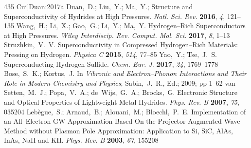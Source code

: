 \documentclass[12pt,letterpaper,oneside]{article}
\begin{document}
\begin{mcitethebibliography}{435}
  Cui]{Duan:2017a}
Duan,~D.; Liu,~Y.; Ma,~Y.;   Structure and
  Superconductivity of Hydrides at High Pressures. \emph{Natl. Sci. Rev.}
  \textbf{2016}, \emph{4}, 121--135\relax
\mciteBstWouldAddEndPuncttrue
\mciteSetBstMidEndSepPunct{\mcitedefaultmidpunct}
{\mcitedefaultendpunct}{\mcitedefaultseppunct}\relax
\EndOfBibitem
{}
Wang,~H.; Li,~X.; Gao,~G.; Li,~Y.; Ma,~Y. Hydrogen--Rich Superconductors at
  High Pressures. \emph{Wiley Interdiscip. Rev. Comput. Mol. Sci.}
  \textbf{2017}, \emph{8}, 1--13\relax
\mciteBstWouldAddEndPuncttrue
\mciteSetBstMidEndSepPunct{\mcitedefaultmidpunct}
{\mcitedefaultendpunct}{\mcitedefaultseppunct}\relax
\EndOfBibitem
{}
Struzhkin,~V.~V. Superconductivity in Compressed Hydrogen--Rich Materials:
  Pressing on Hydrogen. \emph{Physica C} \textbf{2015}, \emph{514},
  77--85\relax
\mciteBstWouldAddEndPuncttrue
\mciteSetBstMidEndSepPunct{\mcitedefaultmidpunct}
{\mcitedefaultendpunct}{\mcitedefaultseppunct}\relax
\EndOfBibitem
{}
Yao,~Y.; Tse,~J.~S. Superconducting Hydrogen Sulfide. \emph{Chem. Eur. J.}
  \textbf{2017}, \emph{24}, 1769--1778\relax
\mciteBstWouldAddEndPuncttrue
\mciteSetBstMidEndSepPunct{\mcitedefaultmidpunct}
{\mcitedefaultendpunct}{\mcitedefaultseppunct}\relax
\EndOfBibitem
{}
Bose,~S.~K.; Kortus,~J. In \emph{Vibronic and Electron--Phonon Interactions and
  Their Role in Modern Chemistry and Physics}; Sabin,~J.~R., Ed.; 2009; pp
  1--62\relax
\mciteBstWouldAddEndPuncttrue
\mciteSetBstMidEndSepPunct{\mcitedefaultmidpunct}
{\mcitedefaultendpunct}{\mcitedefaultseppunct}\relax
\EndOfBibitem
{}
van Setten,~M.~J.; Popa,~V.~A.; de~Wijs,~G.~A.; Brocks,~G. Electronic Structure
  and Optical Properties of Lightweight Metal Hydrides. \emph{Phys. Rev. B}
  \textbf{2007}, \emph{75}, 035204\relax
\mciteBstWouldAddEndPuncttrue
\mciteSetBstMidEndSepPunct{\mcitedefaultmidpunct}
{\mcitedefaultendpunct}{\mcitedefaultseppunct}\relax
\EndOfBibitem
{}
Leb{\`e}gue,~S.; Arnaud,~B.; Alouani,~M.; Bloechl,~P.~E. Implementation of an
  All--Electron GW Approximation Based On the Projector Augmented Wave Method
  without Plasmon Pole Approximation: Application to Si, SiC, AlAs, InAs, NaH
  and KH. \emph{Phys. Rev. B} \textbf{2003}, \emph{67}, 155208\relax

\end{mcitethebibliography}
\end{document}
